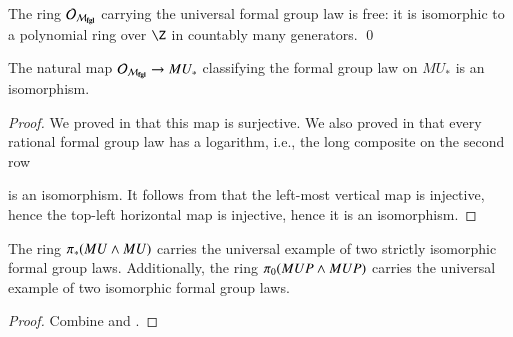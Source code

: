 \begin{theorem}\label{DummyLazardsThm}
The ring $\mathcal{O}_{\mathcal{M}_{\mathbf{fgl}}}$ carrying the universal formal group law is free: it is isomorphic to a polynomial ring over $\Z$ in countably many generators. \qed
\end{theorem}

\begin{corollary}\label{QuillensTheorem}
The natural map $\mathcal{O}_{\mathcal{M}_{\mathbf{fgl}}} \to MU_*$ classifying the formal group law on $MU_*$ is an isomorphism.
\end{corollary}
\begin{proof}
We proved in  that this map is surjective.  We also proved in  that every rational formal group law has a logarithm, i.e., the long composite on the second row
\begin{center}
\end{center}
is an isomorphism.  It follows from  that the left-most vertical map is injective, hence the top-left horizontal map is injective, hence it is an isomorphism.
\end{proof}

\begin{corollary}
The ring $\pi_*(MU \wedge MU)$ carries the universal example of two strictly isomorphic formal group laws.  Additionally, the ring $\pi_0 (MUP \wedge MUP)$ carries the universal example of two isomorphic formal group laws.
\end{corollary}
\begin{proof}
Combine  and .
\end{proof}


























